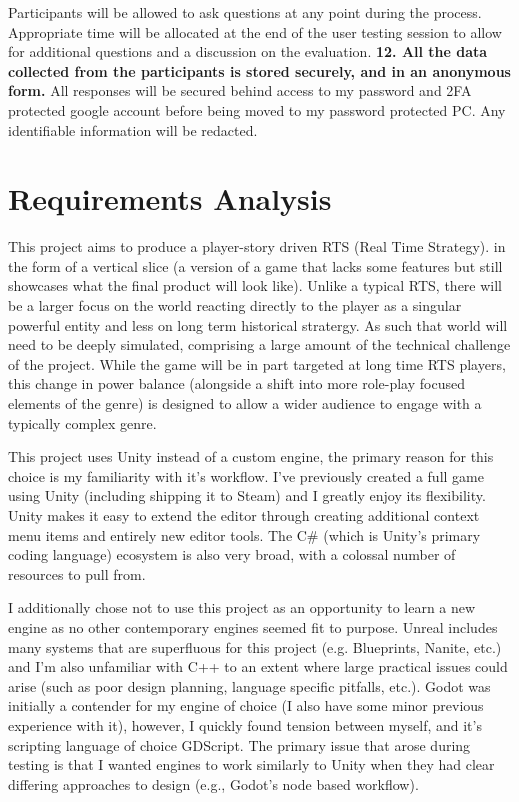 \documentclass{report}
\begin{document}
\begin{raggedright}
\newline
\newline
Participants will be allowed to ask questions at any point during the process. Appropriate time will be allocated at the end of the user testing session to allow for additional questions and a discussion on the evaluation.
\newline
\newline
\textbf{12. All the data collected from the participants is stored securely, and in an
anonymous form.}
\newline
\newline
All responses will be secured behind access to my password and 2FA protected google account before being moved to my password protected PC. Any identifiable information will be redacted.
\end{raggedright}

\chapter{Requirements Analysis}

This project aims to produce a player-story driven RTS (Real Time Strategy). in the form of a vertical slice (a version of a game that lacks some features but still showcases what the final product will look like). Unlike a typical RTS, there will be a larger focus on the world reacting directly to the player as a singular powerful entity and less on long term historical stratergy. As such that world will need to be deeply simulated, comprising a large amount of the technical challenge of the project.
While the game will be in part targeted at long time RTS players, this change in power balance (alongside a shift into more role-play focused elements of the genre) is designed to allow a wider audience to engage with a typically complex genre. 

This project uses Unity instead of a custom engine, the primary reason for this choice is my familiarity with it's workflow. I've previously created a full game using Unity (including shipping it to Steam) and I greatly enjoy its flexibility. Unity makes it easy to extend the editor through creating additional context menu items and entirely new editor tools. 
The C\# (which is Unity's primary coding language) ecosystem is also very broad, with a colossal number of resources to pull from. 

I additionally chose not to use this project as an opportunity to learn a new engine as no other contemporary engines seemed fit to purpose. Unreal includes many systems that are superfluous for this project (e.g. Blueprints, Nanite, etc.) and I'm also unfamiliar with C++ to an extent where large practical issues could arise (such as poor design planning, language specific pitfalls, etc.). Godot was initially a contender for my engine of choice (I also have some minor previous experience with it), however, I quickly found tension between myself, and it's scripting language of choice GDScript. The primary issue that arose during testing is that I wanted engines to work similarly to Unity when they had clear differing approaches to design (e.g., Godot's node based workflow).
\end{document}
